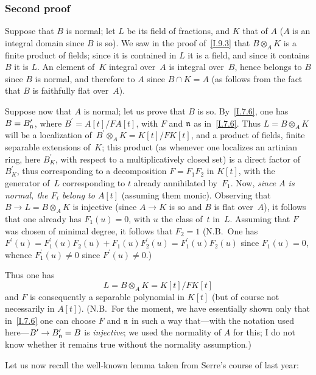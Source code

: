 \subsubsection*{Second proof}
Suppose that $B$ is normal; let $L$ be its field of fractions,
and $K$ that of $A$ ($A$ is an integral domain since $B$ is
so). We saw in the proof of~\ref{I.9.3} that $B\otimes_A K$
is a finite product of fields; since it is contained in $L$
it is a field, and since it contains $B$ it is $L$. An
element of~$K$ integral over~$A$ is integral over~$B$, hence
belongs to $B$ since $B$ is normal, and therefore to $A$
since $B\cap K=A$ (as follows from the fact that $B$ is
faithfully flat over~$A$).

Suppose now that $A$ is normal; let us prove that $B$ is
so. By~\ref{I.7.6}, one has $B=B^\prime_{\mathfrak{n}}$, where
$B^\prime=A[t]/FA[t]$, with $F$ and $\mathfrak{n}$ as
in~\ref{I.7.6}. Thus $L=B\otimes_A K$ will be a localization
of~$B^\prime\otimes_A K=K[t]/FK[t]$, and a product of fields,
finite separable extensions of~$K$; this product (as whenever
one localizes an artinian ring, here $B^\prime_K$, with
respect to a multiplicatively closed set) is a direct
factor of~$B^\prime_K$, thus corresponding to a decomposition
$F=F_1F_2$ in $K[t]$, with the generator of~$L$ corresponding
to $t$ already annihilated by~$F_1$. Now, \emph{since $A$
is normal, the $F_i$ belong to $A[t]$} (assuming them monic).
Observing that $B\to L=B\otimes_A K$ is injective (since
$A\to K$ is so and $B$ is flat over~$A$), it follows that
one already has $F_1(u)=0$, with $u$ the class of~$t$ in~$L$.
Assuming that $F$ was chosen of minimal degree, it follows
that $F_2=1$ (N.B.\ One has
$F^\prime(u)=F^\prime_1(u)F_2(u)+F_1(u)F^\prime_2(u)
=F^\prime_1(u)F_2(u)$ since $F_1(u)=0$, whence
$F^\prime_1(u)\neq0$ since $F^\prime(u)\neq0$.)

Thus
one has
\begin{equation*}
\label{eq:I.9.5.*}
\tag{$*$} L=B\otimes_A K=K[t]/FK[t]
\end{equation*}
and $F$ is consequently a separable polynomial in $K[t]$
(but of course not necessarily in $A[t]$). (N.B.\ For the
moment, we have essentially shown only that in~\ref{I.7.6}
one can choose $F$ and $\mathfrak{n}$ in such a way that---with
the notation used here---$B^\prime\to B^\prime_{\goth{n}}=B$
is \emph{injective}; we used the normality of $A$ for this;
I do not know whether it remains true without the normality
assumption.)

Let us now recall the well-known lemma taken from Serre's
course of last year:

